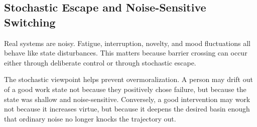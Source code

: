 \subsection{Stochastic Escape and Noise-Sensitive Switching}

Real systems are noisy. Fatigue, interruption, novelty, and mood fluctuations
all behave like state disturbances. This matters because barrier crossing can
occur either through deliberate control or through stochastic escape.

\begin{discussion}
The stochastic viewpoint helps prevent overmoralization. A person may drift out
of a good work state not because they positively chose failure, but because the
state was shallow and noise-sensitive. Conversely, a good intervention may
work not because it increases virtue, but because it deepens the desired basin
enough that ordinary noise no longer knocks the trajectory out.
\end{discussion}
